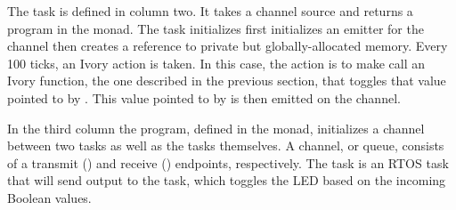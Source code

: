 The  task is defined in column two.  It takes a channel source and
returns a program in the  monad.  The task initializes first
initializes an emitter for the channel then creates a reference to private but
globally-allocated memory.  Every 100 ticks, an Ivory action is taken.  In this
case, the action is to make call an Ivory function, the one described in the
previous section, that toggles that value pointed to by .  This value
pointed to by  is then emitted on the channel.

In the third column the program, defined in the  monad, initializes a
channel between two tasks as well as the tasks themselves.  A channel, or queue,
consists of a transmit () and receive () endpoints, respectively.
The  task is an RTOS task that will send output to the
 task, which toggles the LED based on the incoming Boolean
values.








